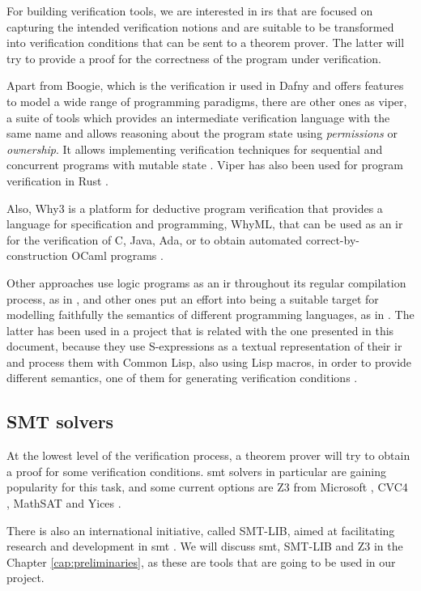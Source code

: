 For building verification tools, we are interested in \gls{ir}s that are focused
on capturing the intended verification notions and are suitable to be
transformed into verification conditions that can be sent to a theorem prover.
The latter will try to provide a proof for the correctness of the program under
verification.

Apart from Boogie, which is the verification \gls{ir} used in Dafny and offers 
features to model a wide range of programming paradigms, there are other ones as
\gls{viper}, a suite of tools which provides an intermediate verification
language with the same name and allows reasoning about the program state using
\textit{permissions} or \textit{ownership}. It allows implementing verification
techniques for sequential and concurrent programs with mutable state
\citep{viper}. Viper has also been used for program verification in Rust 
\citep{astrauskas2022prusti}.

Also, Why3 \citep{Why3} is a platform for deductive program verification that
provides a language for specification and programming, WhyML, that can be used
as an \gls{ir} for the verification of C, Java, Ada, or to obtain automated
correct-by-construction OCaml programs \citep{Why3Manual}.

Other approaches use logic programs as an \gls{ir} throughout its regular
compilation process, as in \cite{horn}, and other ones put an effort into being
a suitable target for modelling faithfully the semantics of different
programming languages, as in \cite{caviart}. The latter has been used in a
project that is related with the one presented in this document, because they
use S-expressions as a textual representation of their \gls{ir} and process them
with Common Lisp, also using Lisp macros, in order to provide different
semantics, one of them for generating verification conditions \citep{cavilisp}.

\subsection{SMT solvers}

At the lowest level of the verification process, a theorem prover will try to
obtain a proof for some verification conditions. \acrshort{smt} solvers in
particular are gaining popularity for this task, and some current options are Z3
from Microsoft \citep{moura2008z3}, CVC4 \citep{barrett2011cvc4}, MathSAT
\citep{bozzano2005mathsat} and Yices \citep{dutertre2006yices}. 

There is also an international initiative, called SMT-LIB, aimed at facilitating
research and development in \gls{smt} \citep{smtLibStandard}. We will discuss 
\gls{smt}, SMT-LIB and Z3 in the Chapter \ref{cap:preliminaries}, as these are
tools that are going to be used in our project.

